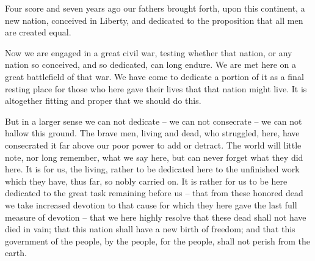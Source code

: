 %
%
%
%
%
%
Four score and seven years ago our fathers brought forth, upon
this continent, a new nation, conceived in Liberty, and  dedicated
to the proposition that all men are created equal.

Now we are engaged in a great civil war, testing whether that
nation, or any nation so conceived, and so dedicated, can long
endure. We are met here on a great battlefield of that war. We
have come to dedicate a portion of it as a final resting place for
those who here gave their lives that that nation might live. It is
altogether fitting and proper that we should do this.

But in a larger sense we can not dedicate -- we can not consecrate
-- we can not hallow this ground. The brave men, living and dead,
who struggled, here, have consecrated it far above our poor power
to add  or detract. The world will little note, nor long remember,
what we say here, but can never forget what they did here. It is
for us, the living, rather to be dedicated here to the  unfinished
work which they have, thus far, so nobly carried on. It is rather
for us to be here dedicated to the great task  remaining before us
-- that from these honored dead we take increased devotion  to
that cause for which they here gave the last full measure of
devotion -- that we here highly resolve that these dead shall not
have died in vain; that this nation shall have a new birth of
freedom; and that this government of the people, by the people,
for the people, shall not perish from the earth.
